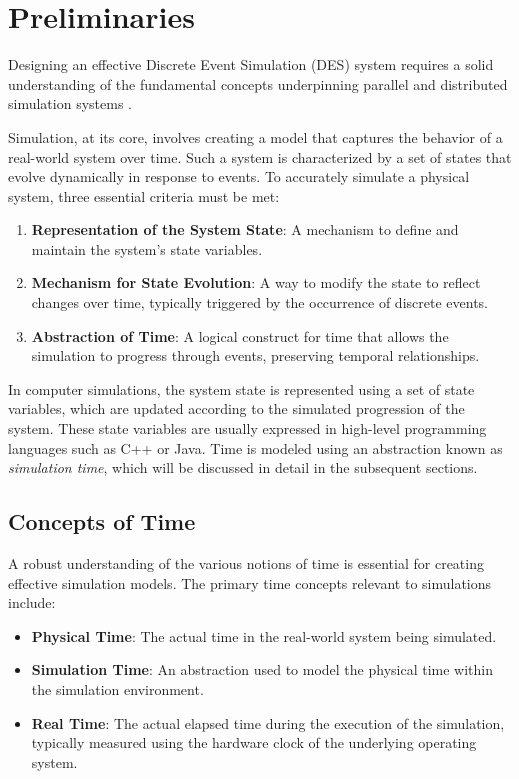 \chapter{Preliminaries}

Designing an effective Discrete Event Simulation (DES) system requires a solid understanding of the fundamental concepts underpinning parallel and distributed simulation systems \cite{PaDSS}.

Simulation, at its core, involves creating a model that captures the behavior of a real-world system over time. Such a system is characterized by a set of states that evolve dynamically in response to events. To accurately simulate a physical system, three essential criteria must be met:

\begin{enumerate}
    \item \textbf{Representation of the System State}: A mechanism to define and maintain the system's state variables.
    \item \textbf{Mechanism for State Evolution}: A way to modify the state to reflect changes over time, typically triggered by the occurrence of discrete events.
    \item \textbf{Abstraction of Time}: A logical construct for time that allows the simulation to progress through events, preserving temporal relationships.
\end{enumerate}

In computer simulations, the system state is represented using a set of state variables, which are updated according to the simulated progression of the system. These state variables are usually expressed in high-level programming languages such as C++ or Java. Time is modeled using an abstraction known as \textit{simulation time}, which will be discussed in detail in the subsequent sections.

\section{Concepts of Time}

A robust understanding of the various notions of time is essential for creating effective simulation models. The primary time concepts relevant to simulations include:

\begin{itemize}
    \item \textbf{Physical Time}: The actual time in the real-world system being simulated.
    \item \textbf{Simulation Time}: An abstraction used to model the physical time within the simulation environment.
    \item \textbf{Real Time}: The actual elapsed time during the execution of the simulation, typically measured using the hardware clock of the underlying operating system.
\end{itemize}

